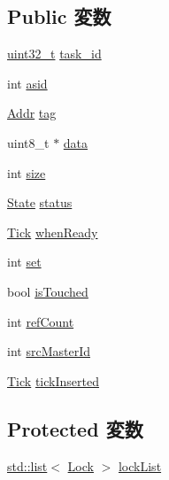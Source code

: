 \subsection*{Public 変数}
\begin{DoxyCompactItemize}
\item 
\hyperlink{Type_8hh_a435d1572bf3f880d55459d9805097f62}{uint32\_\-t} \hyperlink{classCacheBlk_a9956f784c0c9fae2e20cbedeff5decfb}{task\_\-id}
\item 
int \hyperlink{classCacheBlk_a3651868e9554e283ffdc0fb7631a934b}{asid}
\item 
\hyperlink{base_2types_8hh_af1bb03d6a4ee096394a6749f0a169232}{Addr} \hyperlink{classCacheBlk_a37fe97093e3df5a68f35c18538628836}{tag}
\item 
uint8\_\-t $\ast$ \hyperlink{classCacheBlk_abe222f6d3581e7920dcad5306cc906a8}{data}
\item 
int \hyperlink{classCacheBlk_a439227feff9d7f55384e8780cfc2eb82}{size}
\item 
\hyperlink{classCacheBlk_a09dbc3a4ce615f45c897d9ee6fbffb2a}{State} \hyperlink{classCacheBlk_aa54219f67be2dfea4379acbaf99d9e4d}{status}
\item 
\hyperlink{base_2types_8hh_a5c8ed81b7d238c9083e1037ba6d61643}{Tick} \hyperlink{classCacheBlk_a8ec4c113348c43bd822d59bc1f20e70b}{whenReady}
\item 
int \hyperlink{classCacheBlk_abc95fb2bad5b94ceca590f7dacd269b5}{set}
\item 
bool \hyperlink{classCacheBlk_a0d3f1758bf7fdcec892f211bf3553d4f}{isTouched}
\item 
int \hyperlink{classCacheBlk_a43ab0d8eafd71383b2233bdee65911de}{refCount}
\item 
int \hyperlink{classCacheBlk_ab4fab3e5850df5c3ff6cf55f1517a4ad}{srcMasterId}
\item 
\hyperlink{base_2types_8hh_a5c8ed81b7d238c9083e1037ba6d61643}{Tick} \hyperlink{classCacheBlk_a238d11cc885d0b7adbaefef41a882bd8}{tickInserted}
\end{DoxyCompactItemize}
\subsection*{Protected 変数}
\begin{DoxyCompactItemize}
\item 
\hyperlink{classstd_1_1list}{std::list}$<$ \hyperlink{classCacheBlk_1_1Lock}{Lock} $>$ \hyperlink{classCacheBlk_a7e5fa7f4cd7e9dfee57c929c162daf0b}{lockList}
\end{DoxyCompactItemize}



